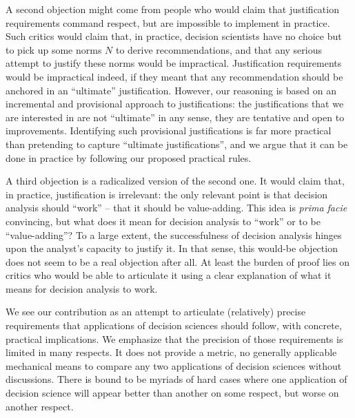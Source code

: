 \documentclass[preprint, french, english, 11pt, authoryear]{elsarticle}%
\begin{document}
A second objection might come from people who would claim that justification requirements command respect, but are impossible to implement in practice. Such critics would claim that, in practice, decision scientists have no choice but to pick up some norms $N$ to derive recommendations, and that any serious attempt to justify these norms would be impractical. Justification requirements would be impractical indeed, if they meant that any recommendation should be anchored in an “ultimate” justification. However, our reasoning is based on an incremental and provisional approach to justifications: the justifications that we are interested in are not ``ultimate'' in any sense, they are tentative and open to improvements. Identifying such provisional justifications is far more practical than pretending to capture ``ultimate justifications'', and we argue that it can be done in practice by following our proposed practical rules.

A third objection is a radicalized version of the second one. It would claim that, in practice, justification is irrelevant: the only relevant point is that decision analysis should ``work'' -- that it should be value-adding. This idea is \emph{prima facie} convincing, but what does it mean for decision analysis to ``work'' or to be ``value-adding''? 
To a large extent, the successfulness of decision analysis hinges upon the analyst's capacity to justify it. In that sense, this would-be objection does not seem to be a real objection after all. At least the burden of proof lies on critics who would be able to articulate it using a clear explanation of what it means for decision analysis to work. 

We see our contribution as an attempt to articulate (relatively) precise requirements that applications of decision sciences should follow, with concrete, practical implications. We emphasize that the precision of those requirements is limited in many respects.
It does not provide a metric, no generally applicable mechanical means to compare any two applications of decision sciences without discussions. There is bound to be myriads of hard cases where one application of decision science will appear better than another on some respect, but worse on another respect.
\end{document}
